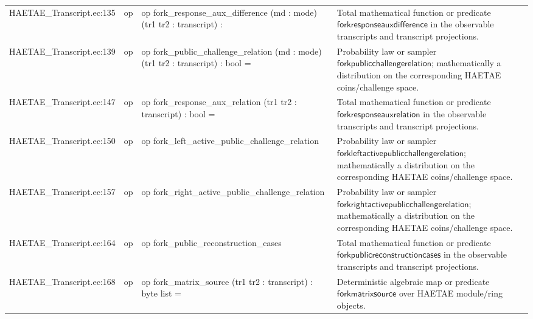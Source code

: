 \documentclass[10pt]{article}
\begin{document}
\begin{longtable}{L{0.11\textwidth}L{0.055\textwidth}L{0.385\textwidth}L{0.41\textwidth}}
HAETAE\_\allowbreak{}Transcript.\allowbreak{}ec:\allowbreak{}135 & op & {\ttfamily\scriptsize op fork\_\allowbreak{}response\_\allowbreak{}aux\_\allowbreak{}difference (md : mode) (tr1 tr2 : transcript) :} & Total mathematical function or predicate $\mathsf{forkresponseauxdifference}$ in the observable transcripts and transcript projections. \\
HAETAE\_\allowbreak{}Transcript.\allowbreak{}ec:\allowbreak{}139 & op & {\ttfamily\scriptsize op fork\_\allowbreak{}public\_\allowbreak{}challenge\_\allowbreak{}relation (md : mode) (tr1 tr2 : transcript) : bool =} & Probability law or sampler $\mathsf{forkpublicchallengerelation}$; mathematically a distribution on the corresponding HAETAE coins/challenge space. \\
HAETAE\_\allowbreak{}Transcript.\allowbreak{}ec:\allowbreak{}147 & op & {\ttfamily\scriptsize op fork\_\allowbreak{}response\_\allowbreak{}aux\_\allowbreak{}relation (tr1 tr2 : transcript) : bool =} & Total mathematical function or predicate $\mathsf{forkresponseauxrelation}$ in the observable transcripts and transcript projections. \\
HAETAE\_\allowbreak{}Transcript.\allowbreak{}ec:\allowbreak{}150 & op & {\ttfamily\scriptsize op fork\_\allowbreak{}left\_\allowbreak{}active\_\allowbreak{}public\_\allowbreak{}challenge\_\allowbreak{}relation} & Probability law or sampler $\mathsf{forkleftactivepublicchallengerelation}$; mathematically a distribution on the corresponding HAETAE coins/challenge space. \\
HAETAE\_\allowbreak{}Transcript.\allowbreak{}ec:\allowbreak{}157 & op & {\ttfamily\scriptsize op fork\_\allowbreak{}right\_\allowbreak{}active\_\allowbreak{}public\_\allowbreak{}challenge\_\allowbreak{}relation} & Probability law or sampler $\mathsf{forkrightactivepublicchallengerelation}$; mathematically a distribution on the corresponding HAETAE coins/challenge space. \\
HAETAE\_\allowbreak{}Transcript.\allowbreak{}ec:\allowbreak{}164 & op & {\ttfamily\scriptsize op fork\_\allowbreak{}public\_\allowbreak{}reconstruction\_\allowbreak{}cases} & Total mathematical function or predicate $\mathsf{forkpublicreconstructioncases}$ in the observable transcripts and transcript projections. \\
HAETAE\_\allowbreak{}Transcript.\allowbreak{}ec:\allowbreak{}168 & op & {\ttfamily\scriptsize op fork\_\allowbreak{}matrix\_\allowbreak{}source (tr1 tr2 : transcript) : byte list =} & Deterministic algebraic map or predicate $\mathsf{forkmatrixsource}$ over HAETAE module/ring objects. \\

\end{longtable}
\end{document}
